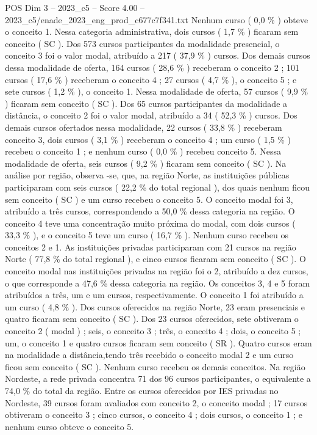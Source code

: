 \begin{textsample}{POS Dim 3 – 2023\_c5 – Score 4.00 – 2023\_c5/enade\_2023\_eng\_prod\_c677c7f341.txt}
Nenhum curso ( 0,0 \% ) obteve o conceito 1.
Nessa categoria administrativa, dois cursos ( 1,7 \% ) ficaram sem conceito ( SC ).
Dos 573 cursos participantes da modalidade presencial, o conceito 3 foi o valor modal, atribuído a 217 ( 37,9 \% ) cursos.
Dos demais cursos dessa modalidade de oferta, 164 cursos ( 28,6 \% ) receberam o conceito 2 ; 101 cursos ( 17,6 \% ) receberam o conceito 4 ; 27 cursos ( 4,7 \% ), o conceito 5 ; e sete cursos ( 1,2 \% ), o conceito 1.
Nessa modalidade de oferta, 57 cursos ( 9,9 \% ) ficaram sem conceito ( SC ).
Dos 65 cursos participantes da modalidade a distância, o conceito 2 foi o valor modal, atribuído a 34 ( 52,3 \% ) cursos.
Dos demais cursos ofertados nessa modalidade, 22 cursos ( 33,8 \% ) receberam conceito 3, dois cursos ( 3,1 \% ) receberam o conceito 4 ; um curso ( 1,5 \% ) recebeu o conceito 1 ; e nenhum curso ( 0,0 \% ) recebeu conceito 5.
Nessa modalidade de oferta, seis cursos ( 9,2 \% ) ficaram sem conceito ( SC ).
Na análise por região, observa -se, que, na região Norte, as instituições públicas participaram com seis cursos ( 22,2 \% do total regional ), dos quais nenhum ficou sem conceito ( SC ) e um curso recebeu o conceito 5.
O conceito modal foi 3, atribuído a três cursos, correspondendo a 50,0 \% dessa categoria na região.
O conceito 4 teve uma concentração muito próxima do modal, com dois cursos ( 33,3 \% ), e o conceito 5 teve um curso ( 16,7 \% ).
Nenhum curso recebeu os conceitos 2 e 1.
As instituições privadas participaram com 21 cursos na região Norte ( 77,8 \% do total regional ), e cinco cursos ficaram sem conceito ( SC ).
O conceito modal nas instituições privadas na região foi o 2, atribuído a dez cursos, o que corresponde a 47,6 \% dessa categoria na região.
Os conceitos 3, 4 e 5 foram atribuídos a três, um e um cursos, respectivamente.
O conceito 1 foi atribuído a um curso ( 4,8 \% ).
Dos cursos oferecidos na região Norte, 23 eram presenciais e quatro ficaram sem conceito ( SC ).
Dos 23 cursos oferecidos, sete obtiveram o conceito 2 ( modal ) ; seis, o conceito 3 ; três, o conceito 4 ; dois, o conceito 5 ; um, o conceito 1 e quatro cursos ficaram sem conceito ( SR ).
Quatro cursos eram na modalidade a distância,tendo três recebido o conceito modal 2 e um curso ficou sem conceito ( SC ).
Nenhum curso recebeu os demais conceitos.
Na região Nordeste, a rede privada concentra 71 dos 96 cursos participantes, o equivalente a 74,0 \% do total da região.
Entre os cursos oferecidos por IES privadas no Nordeste, 39 cursos foram avaliados com conceito 2, o conceito modal ; 17 cursos obtiveram o conceito 3 ; cinco cursos, o conceito 4 ; dois cursos, o conceito 1 ; e nenhum curso obteve o conceito 5.

\end{textsample}
